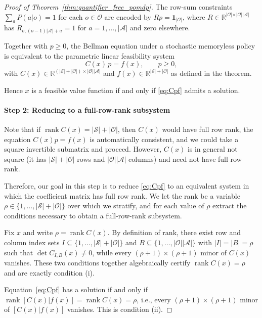 \documentclass{article}
\theoremstyle{definition}
\theoremstyle{remark}
\newcommand{\rank}{\operatorname{rank}}
\begin{document}
\begin{proof}[Proof of Theorem~\ref{thm:quantifier_free_pomdp}]
The row-sum constraints $\sum_a P(a |  o)=1$ for each $o\in\mathcal O$ are encoded by $Rp=\mathbf 1_{\vert \mathcal O\vert }$, where $R\in\mathbb R^{\vert \mathcal O\vert \times \vert \mathcal O\vert \vert \mathcal A\vert }$ has $R_{o,(o-1)\vert \mathcal A\vert +a}=1$ for $a=1,\dots,\vert \mathcal A\vert $ and zero elsewhere. 

Together with $p\ge 0$, the Bellman equation under a stochastic memoryless policy is equivalent to the parametric linear feasibility system
\begin{equation}
\label{eq:Cpf}
C(x)\,p = f(x), \qquad p\ge 0,
\end{equation}
with $C(x)\in\mathbb R^{(|\mathcal S|+|\mathcal O|)\times |\mathcal O||\mathcal A|}$ and $f(x)\in\mathbb R^{|\mathcal S|+|\mathcal O|}$ as defined in the theorem. 

Hence $x$ is a feasible value function if and only if \eqref{eq:Cpf} admits a solution.

\paragraph{Step 2: Reducing to a full-row-rank subsystem}
Note that if $\rank C(x)=|\mathcal S|+|\mathcal O|$, then $C(x)$ would have full row rank, the equation $C(x)p=f(x)$ is automatically consistent, and we could take a square invertible submatrix and proceed. However, $C(x)$ is in general not square (it has $|\mathcal S|+|\mathcal O|$ rows and $|\mathcal O||\mathcal A|$ columns) and need not have full row rank.

Therefore, our goal in this step is to reduce \eqref{eq:Cpf} to an equivalent system in which the coefficient matrix has full row rank.  We let the rank be a variable $\rho\in\{1,\dots,|\mathcal S|+|\mathcal O|\}$ over which we stratify, and for each value of $\rho$ extract the conditions necessary to obtain a full-row-rank subsystem. 

Fix $x$ and write $\rho=\rank C(x)$. By definition of rank, there exist row and column index sets $I\subseteq\{1,\dots,|\mathcal S|+|\mathcal O|\}$ and $B\subseteq\{1,\dots,|\mathcal O||\mathcal A|\}$ with $|I|=|B|=\rho$ such that $\det C_{I,B}(x)\ne 0$, while every $(\rho+1)\times(\rho+1)$ minor of $C(x)$ vanishes. These two conditions together algebraically certify $\rank C(x)=\rho$ and are exactly condition (i).

Equation~\eqref{eq:Cpf} has a solution if and only if $\rank[C(x) |  f(x)] = \rank C(x) = \rho$, i.e., every $(\rho+1)\times(\rho+1)$ minor of $[C(x) |  f(x)]$ vanishes. This is condition (ii).


\end{proof}
\end{document}
